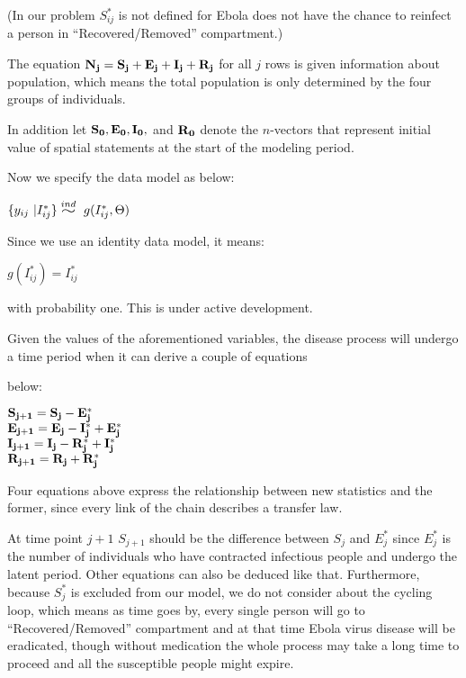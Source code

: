 \documentclass[11pt]{article}
\newcommand{\widesim}[2][1.5]{
      \mathrel{\overset{#2}{\scalebox{#1}[1]{$\sim$}}}
  }
\newcommand \mbreak {\\ \vspace{0.1in}}
\begin{document}
(In our problem {$S^*_{ij}$} is not defined for Ebola does not have the chance to reinfect a person in ``Recovered/Removed'' compartment.)

The equation {$\bf{N_j} = \bf{S_j + E_j + I_j + R_j}$} for all $j$ rows is given information about population, which means the total population is only determined by the four groups of individuals. 

 In addition let ${\bf{S_0, E_0, I_0,}}$ and ${\bf{R_0}}$ denote the $n$-vectors that represent initial value of spatial statements at the start of the modeling period.
 
    Now we specify the data model as below: 

    \vspace{0.15in}

    \begin{center}
        ${ \{y_{ij}\ | I^*_{ij}\} \widesim{ind}\ g(I^*_{ij}, \Theta)  }$
    \end{center}

  Since we use an identity data model, it means: 
    \begin{center}
        $g(I^*_{ij}) = I^*_{ij}$  
    \end{center}
    with probability one. This is under active development. \\

    \vspace{0.15in}




    Given the values of the aforementioned variables, the disease process will undergo a time period when it can derive a couple of equations 

below: 
    \begin{center}
       { $\bf{S_{j+1}} = \bf{S_j} - \bf{E_j^*} $}\mbreak
       { $\bf{E_{j+1}} = \bf{E_j} - \bf{I_j^*} + \bf{E_j^*}$}\mbreak
       { $\bf{I_{j+1}} = \bf{I_j} - \bf{R_j^*} + \bf{I_j^*}$}\mbreak
       { $\bf{R_{j+1}} = \bf{R_j} + \bf{R_j^*} $}\mbreak
    \end{center}
    \vspace{0.15in}

   Four equations above express the relationship between new statistics and the former, since every link of the chain describes a transfer law. 

At time point ${j+1}$ ${S_{j+1}}$ should be the difference between ${S_j}$ and ${E_j^*}$ since ${E_j^*}$ is the number of individuals who have contracted infectious people and undergo the latent period. Other equations can also be deduced like that. Furthermore, because ${S_j^*}$ is excluded from our model, we do not consider about the cycling loop, which means as time goes by, every single person will go to ``Recovered/Removed'' compartment and at that time Ebola virus disease will be eradicated, though without medication the whole process may take a long time to proceed and all the susceptible people might expire.
\end{document}
